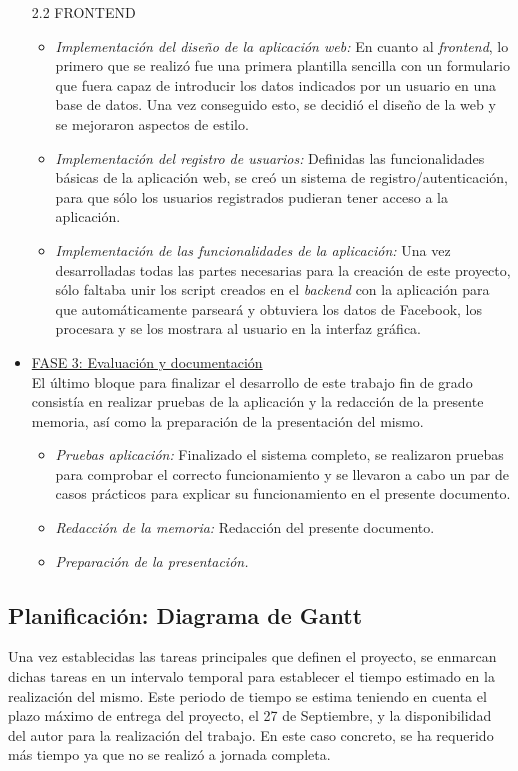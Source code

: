 \begin{itemize}
    2.2 FRONTEND
    \begin{itemize}
    \item \textit{Implementación del diseño de la aplicación web: } En cuanto al \textit{frontend}, lo primero que se realizó fue una primera plantilla sencilla con un formulario que fuera capaz de introducir los datos indicados por un usuario en una base de datos. Una vez conseguido esto, se decidió el diseño de la web y se mejoraron
aspectos de estilo.
    \item \textit{Implementación del registro de usuarios: }Definidas las funcionalidades básicas de la aplicación web, se creó un sistema de registro/autenticación, para que sólo los usuarios registrados pudieran tener acceso a la aplicación.
    \item \textit{Implementación de las funcionalidades de la aplicación: } Una vez desarrolladas todas las partes necesarias para la creación de este proyecto, sólo faltaba unir los script creados en el \textit{backend} con la aplicación para que automáticamente parseará y obtuviera los datos de Facebook, los procesara y se los mostrara al usuario en la interfaz gráfica.
  \end{itemize}
  \item \underline{FASE 3: Evaluación y documentación} \hfill  \\
  El último bloque para finalizar el desarrollo de este trabajo fin de grado consistía en realizar pruebas de la aplicación y la redacción de la presente memoria, así como la preparación de la presentación del mismo.
    \begin{itemize}
    \item \textit{Pruebas aplicación:} Finalizado el sistema completo, se realizaron pruebas para comprobar el correcto funcionamiento y se llevaron a cabo un par de casos prácticos para explicar su funcionamiento en el presente documento.  
    \item \textit{Redacción de la memoria: } Redacción del presente documento.
    \item \textit{Preparación de la presentación.}
  \end{itemize}  
\end{itemize}

\subsection{Planificación: Diagrama de Gantt}
Una vez establecidas las tareas principales que definen el proyecto, se enmarcan dichas tareas en un intervalo temporal para establecer el tiempo estimado en la realización del mismo. Este periodo de tiempo se estima teniendo en cuenta el plazo máximo de entrega del proyecto, el 27 de Septiembre, y la disponibilidad del autor para la realización del trabajo. En este caso concreto, se ha requerido más tiempo ya que no se realizó a jornada completa.

